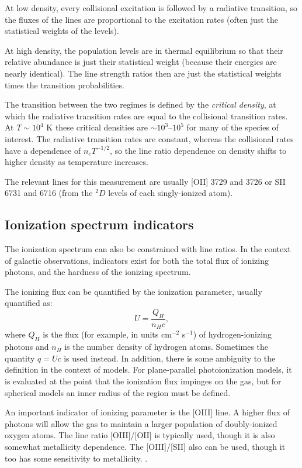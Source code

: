 At low density, every collisional excitation is followed by a
radiative transition, so the fluxes of the lines are proportional to
the excitation rates (often just the statistical weights of the
levels).

At high density, the population levels are in thermal equilibrium so
that their relative abundance is just their statistical weight
(because their energies are nearly identical). The line strength
ratios then are just the statistical weights times the transition
probabilities. 

The transition between the two regimes is defined by the {\it critical
density}, at which the radiative transition rates are equal to the
collisional transition rates. At $T\sim 10^4$ K these critical
densities are $\sim 10^3$--$10^5$ for many of the species of
interest. The radiative transition rates are constant, whereas the
collisional rates have a dependence of $n_e T^{-1/2}$, so the
line ratio dependence on density shifts to higher density as
temperature increases. 

The relevant lines for this measurement are usually [OII] 3729 and
3726 or SII 6731 and 6716 (from the ${}^2D$ levels of each
singly-ionized atom).

\subsection{Ionization spectrum indicators}

The ionization spectrum can also be constrained with line ratios. In
the context of galactic observations, indicators exist for both the
total flux of ionizing photons, and the hardness of the ionizing
spectrum.

The ionizing flux can be quantified by the ionization parameter,
usually quantified as:
\begin{equation}
U = \frac{Q_{H}}{n_H c},
\end{equation}
where $Q_H$ is the flux (for example, in units cm$^{-2}$ s$^{-1}$) of
hydrogen-ionizing photons and $n_H$ is the number density of hydrogen
atoms. Sometimes the quantity $q=U c$ is used instead. In addition,
there is some ambiguity to the definition in the context of
models. For plane-parallel photoionization models, it is evaluated at
the point that the ionization flux impinges on the gas, but for
spherical models an inner radius of the region must be defined.

An important indicator of ionizing parameter is the [OIII] line. A
higher flux of photons will allow the gas to maintain a larger
population of doubly-ionized oxygen atoms. The line ratio [OIII]/[OII]
is typically used, though it is also somewhat metallicity
dependence. The [OIII]/[SII] also can be used, though it too has some
sensitivity to metallicity.  .

